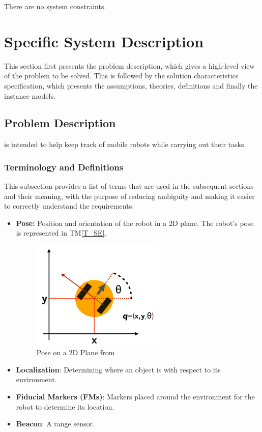 \documentclass[12pt]{article}
\newcommand{\tref}[1]{TM\ref{#1}}
\begin{document}
There are no system constraints.

\section{Specific System Description}

This section first presents the problem description, which gives a high-level
view of the problem to be solved.  This is followed by the solution characteristics
specification, which presents the assumptions, theories, definitions and finally
the instance models.

\subsection{Problem Description}\label{Sec_pd}

\progname is intended to help keep track of mobile robots while carrying out their tasks.

\subsubsection{Terminology and  Definitions}

This subsection provides a list of terms that are used in the subsequent
sections and their meaning, with the purpose of reducing ambiguity and making it
easier to correctly understand the requirements:

\begin{itemize}

\item \textbf{Pose:} Position and orientation of the robot in a 2D plane. The robot's pose is represented in \tref{T_SE}.
\begin{figure}[h!]
  \begin{center}
   \includegraphics[width=0.6\textwidth]{pose.png}
  \caption{Pose on a 2D Plane from \cite{DiCaro2017}}
  \label{Fig_Pose} 
  \end{center}
\end{figure}

\item \textbf{Localization}: Determining where an object is with respect to its environment.
\item \textbf{Fiducial Markers (FMs)}: Markers placed around the environment for the robot to determine its location.
\item \textbf{Beacon}: A range sensor.

\end{itemize}
\end{document}
